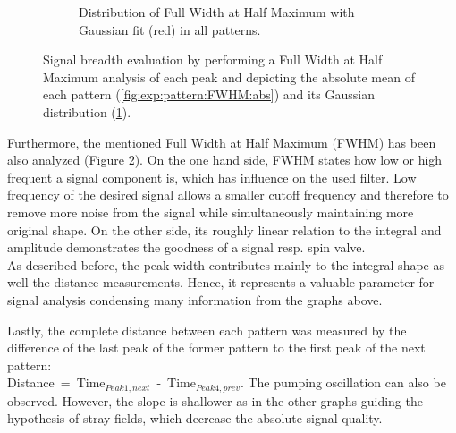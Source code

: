 \begin{figure}[h!]
\begin{subfigure}[r]{0.49\textwidth}
		\caption{Distribution of Full Width at Half Maximum with Gaussian fit (red) in all patterns.}
		\label{fig:exp:pattern:FWHM:hist}
	\end{subfigure}
	\caption{Signal breadth evaluation by performing a Full Width at Half Maximum analysis of each peak and depicting the absolute mean of each pattern (\protect\ref{fig:exp:pattern:FWHM:abs}) and its Gaussian distribution (\protect\ref{fig:exp:pattern:FWHM:hist}).}
	\label{fig:exp:pattern:FWHM}
\end{figure}
\clearpage
Furthermore, the mentioned Full Width at Half Maximum (FWHM) has been also analyzed (Figure \ref{fig:exp:pattern:FWHM}). On the one hand side, FWHM states how low or high frequent a signal component is, which has influence on the used filter. Low frequency of the desired signal allows a smaller cutoff frequency and therefore to remove more noise from the signal while simultaneously maintaining more original shape. On the other side, its roughly linear relation to the integral and amplitude demonstrates the goodness of a signal resp. spin valve. \\
As described before, the peak width contributes mainly to the integral shape as well the distance measurements. Hence, it represents a valuable parameter for signal analysis condensing many information from the graphs above. 


Lastly, the complete distance between each pattern was measured by the difference of the last peak of the former pattern to the first peak of the next pattern: \\ 
Distance~=~Time$_{Peak 1, next}$~-~Time$_{Peak 4, prev}$. The pumping oscillation can also be observed. However, the slope is shallower as in the other graphs guiding the hypothesis of stray fields, which decrease the absolute signal quality. 

